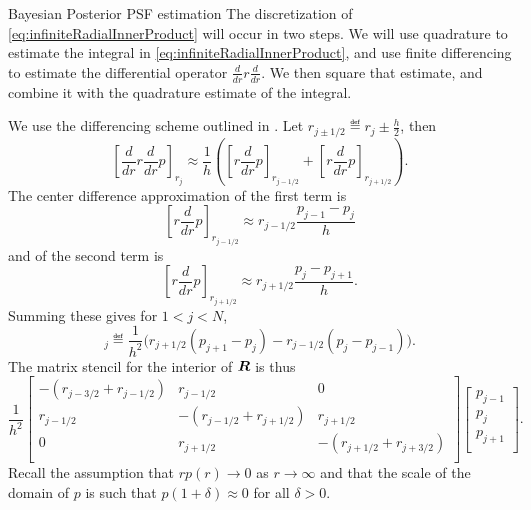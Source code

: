 \begin{chapter}{Bayesian Posterior PSF estimation}
The discretization of \eqref{eq:infiniteRadialInnerProduct} will occur in two steps. 
We will use quadrature to estimate the integral in \eqref{eq:infiniteRadialInnerProduct}, and use finite differencing to estimate the differential operator $\frac d{dr} r \frac d{dr}$. 
We then square that estimate, and combine it with the quadrature estimate of the integral.

We use the differencing scheme outlined in \citep{morton2005numerical}.
Let $r_{j\pm 1/2}\eqdef r_j \pm \frac h2$, then  
\begin{equation}
  \left[\frac d{dr} r\frac d{dr} p\right]_{r_j} \approx\frac 1h\left( \left[r\frac d{dr}p\right]_{r_{j-1/2}} +  \left[r\frac d{dr}p\right]_{r_{j+1/2}}\right). 
\end{equation}
The center difference approximation of the first term is
\begin{equation}
  \left[r\frac d {dr}p\right]_{r_{j-1/2}} \approx r_{j-1/2} \frac{p_{j-1} - p_{j}}{h}
\end{equation}
and of the second term is
\begin{equation}
  \left[r\frac d {dr}p\right]_{r_{j+1/2}} \approx r_{j+1/2} \frac{p_{j} - p_{j+1}}{h}.
\end{equation}
Summing these gives for $1<j<N$,
\begin{equation}
  [\bm R \bm p]_j \eqdef \frac{1}{h^2} \Big( r_{j+1/2}(p_{j+1} - p_j) - r_{j-1/2}(p_{j} - p_{j-1})\Big).
  \label{laplacian_discretization}
\end{equation}
The matrix stencil for the interior of $\mbox{\boldmath$R$}$ is thus
\begin{equation}
  \frac{1}{h^2}
  \left[\begin{array}{ccc}
    -(r_{j-3/2} + r_{j-1/2}) & r_{j-1/2} & 0             \\
    r_{j-1/2} & -(r_{j-1/2} + r_{j+1/2}) & r_{j+1/2}     \\
    0 & r_{j+1/2} & -(r_{j+1/2} + r_{j+3/2}) \\
  \end{array}\right]
  \left[\begin{array}{c}
    p_{j-1} \\
    p_{j}   \\
    p_{j+1} \\
  \end{array}\right].
  \label{laplacian_discretization_stencil}
\end{equation}
Recall the assumption that $rp(r) \to 0$ as $r\to \infty$ and that the scale of the domain of $p$ is such that $p(1+\delta)\approx 0$ for all $\delta >0$.

\end{chapter}
